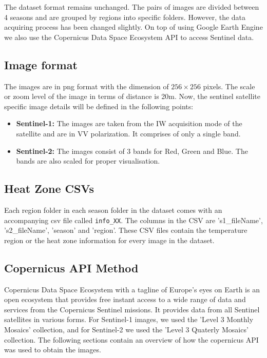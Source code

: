 The dataset format remains unchanged. The pairs of images are divided between 4 seasons and are grouped by regions into specific folders. However, the data acquiring process has been changed slightly. On top of using Google Earth Engine\cite{GORELICK201718} we also use the Copernicus Data Space Ecosystem API to access Sentinel data.

\subsection{Image format}
The images are in png format with the dimension of $256\times256$ pixels. The scale or zoom level of the image in terms of distance is 20m. Now, the sentinel satellite specific image details will be defined in the following points:
\begin{itemize}
    \item \textbf{Sentinel-1:} The images are taken from the IW acquisition mode of the satellite and are in VV polarization. It comprises of only a single band.
    \item \textbf{Sentinel-2:} The images consist of 3 bands for Red, Green and Blue. The bands are also scaled for proper visualisation.
\end{itemize}

\subsection{Heat Zone CSVs}
Each region folder in each season folder in the dataset comes with an accompanying csv file called \texttt{info\_XX}. The columns in the CSV are 's1\_fileName', 's2\_fileName', 'season' and 'region'. These CSV files contain the temperature region or the heat zone information for every image in the dataset.

\subsection{Copernicus API Method}
Copernicus Data Space Ecosystem with a tagline of Europe's eyes on Earth is an open ecosystem that provides free instant access to a wide range of data and services from the Copernicus Sentinel missions\cite{copernicusHome}. It provides data from all Sentinel satellites in various forms. For Sentinel-1 images, we used the 'Level 3 Monthly Mosaics' collection, and for Sentinel-2 we used the 'Level 3 Quaterly Mosaics' collection.
The following sections contain an overview of how the copernicus API was used to obtain the images.

